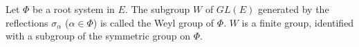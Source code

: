 Let $\Phi$ be a root system in $E$. The subgroup $W$ of $GL(E)$ generated by the reflections $\sigma_\alpha$ ($\alpha \in \Phi$) is called the Weyl group of $\Phi$. $W$ is a finite group, identified with a subgroup of the symmetric group on $\Phi$.
